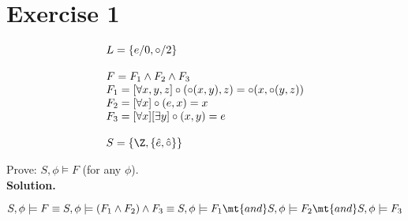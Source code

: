 \section{Exercise 1}

$$
	\begin{array}{l}
		L = \{e/0,\circ/2\}\\
		\\
		F = F_1 \wedge F_2 \wedge F_3\\
		F_1 = [\forall x,y,z] \circ(\circ(x,y),z) = \circ(x,\circ(y,z))\\
		F_2 = [\forall x] \circ(e,x) = x\\
		F_3 = [\forall x][\exists y] \circ(x,y) = e\\
		\\
		S = \{\Z,\{\hat{e},\hat{\circ}\}\}
	\end{array}
$$

Prove: $S,\phi \models F$ (for any $\phi$).\\

\noindent
\textbf{Solution.}

$$
	S,\phi \models F \equiv S,\phi \models (F_1 \wedge F_2) \wedge F_3 \equiv S,\phi \models F_1 \mt{ and } S,\phi \models F_2 \mt{ and } S,\phi \models F_3			
$$


